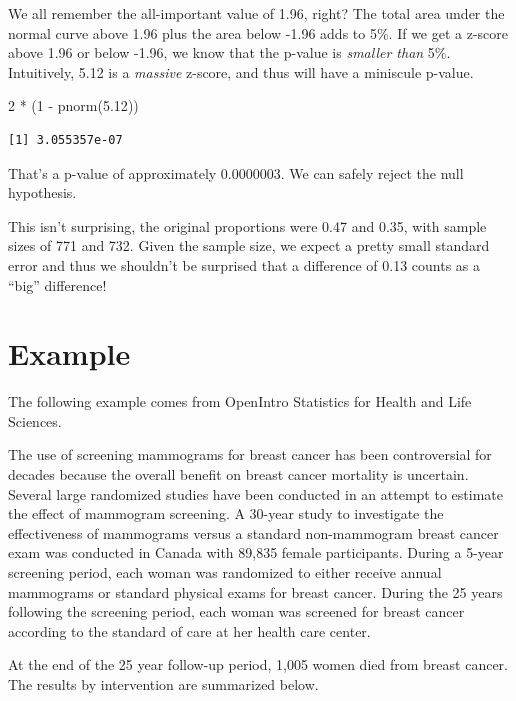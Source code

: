 \documentclass[
  letterpaper,
  DIV=11,
  numbers=noendperiod,
  oneside]{scrreprt}
\newenvironment{Shaded}{\begin{snugshade}}{\end{snugshade}}
\newcommand{\DecValTok}[1]{\textcolor[rgb]{0.68,0.00,0.00}{#1}}
\newcommand{\FloatTok}[1]{\textcolor[rgb]{0.68,0.00,0.00}{#1}}
\newcommand{\FunctionTok}[1]{\textcolor[rgb]{0.28,0.35,0.67}{#1}}
\newcommand{\NormalTok}[1]{\textcolor[rgb]{0.00,0.23,0.31}{#1}}
\newcommand{\SpecialCharTok}[1]{\textcolor[rgb]{0.37,0.37,0.37}{#1}}
\begin{document}
We all remember the all-important value of 1.96, right? The total area
under the normal curve above 1.96 plus the area below -1.96 adds to 5\%.
If we get a z-score above 1.96 or below -1.96, we know that the p-value
is \emph{smaller than} 5\%. Intuitively, 5.12 is a \emph{massive}
z-score, and thus will have a miniscule p-value.

\begin{Shaded}
\begin{Highlighting}[]
\DecValTok{2} \SpecialCharTok{*}\NormalTok{ (}\DecValTok{1} \SpecialCharTok{{-}} \FunctionTok{pnorm}\NormalTok{(}\FloatTok{5.12}\NormalTok{))}
\end{Highlighting}
\end{Shaded}

\begin{verbatim}
[1] 3.055357e-07
\end{verbatim}

That's a p-value of approximately 0.0000003. We can safely reject the
null hypothesis.

This isn't surprising, the original proportions were 0.47 and 0.35, with
sample sizes of 771 and 732. Given the sample size, we expect a pretty
small standard error and thus we shouldn't be surprised that a
difference of 0.13 counts as a ``big'' difference!

\hypertarget{example-5}{%
\section{Example}\label{example-5}}

The following example comes from OpenIntro Statistics for Health and
Life Sciences.

The use of screening mammograms for breast cancer has been controversial
for decades because the overall benefit on breast cancer mortality is
uncertain. Several large randomized studies have been conducted in an
attempt to estimate the effect of mammogram screening. A 30-year study
to investigate the effectiveness of mammograms versus a standard
non-mammogram breast cancer exam was conducted in Canada with 89,835
female participants. During a 5-year screening period, each woman was
randomized to either receive annual mammograms or standard physical
exams for breast cancer. During the 25 years following the screening
period, each woman was screened for breast cancer according to the
standard of care at her health care center.

At the end of the 25 year follow-up period, 1,005 women died from breast
cancer. The results by intervention are summarized below.
\end{document}
